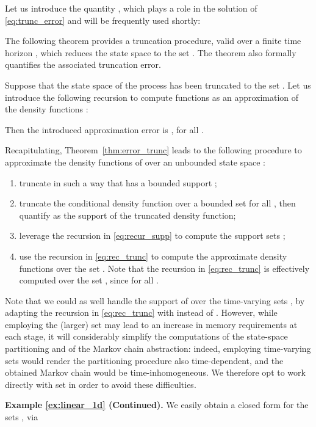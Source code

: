 \documentclass{LMCS}
\begin{document}
Let us introduce the quantity , which plays a role in the solution of \eqref{eq:trunc_error} and will be frequently used shortly:


The following theorem provides a truncation procedure, 
valid over a finite time horizon , 
which reduces the state space  to the set . 
The theorem also formally quantifies the associated truncation error. 

\begin{thm}
\label{thm:error_trunc}
Suppose that the state space of the process  has been truncated to the set . 
Let us introduce the following recursion to compute functions  as an approximation of the density functions : 

Then the introduced approximation error is
,
for all .
\end{thm}
Recapitulating,  
Theorem~\ref{thm:error_trunc} leads to the following procedure to approximate the density functions  of  over an unbounded state space : 
\begin{enumerate}
\item truncate  in such a way that  has a bounded support ; 
\item truncate the conditional density function  over
a bounded set for all , 
then quantify  as the support of the truncated density function;
\item leverage the recursion in \eqref{eq:recur_supp} to compute the support sets ; 
\item use the recursion in \eqref{eq:rec_trunc} to compute the approximate density functions  over the set .
Note that the recursion in \eqref{eq:rec_trunc} is effectively computed over the set , since  for all .  
\end{enumerate}

\noindent Note that we could as well handle the support of  over the time-varying sets , 
by adapting the recursion in \eqref{eq:rec_trunc} with  instead of .  
However, 
while employing the (larger) set  may lead to an increase in memory requirements at each stage,  
it will considerably simplify the computations of the state-space partitioning and of the Markov chain abstraction:   
indeed, employing time-varying sets  would render the partitioning procedure also time-dependent, 
and the obtained Markov chain would be time-inhomogeneous.
We therefore opt to work directly with set  in order to avoid these difficulties.  

\medskip 

\noindent\textbf{Example \ref{ex:linear_1d} (Continued).}
We easily obtain a closed form for the sets , via 
\end{document}
